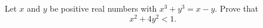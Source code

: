 Let $ x$ and $ y$ be positive real numbers with $ x^3 + y^3 = x - y.$ Prove that \[ x^2 + 4y^2 < 1.\]